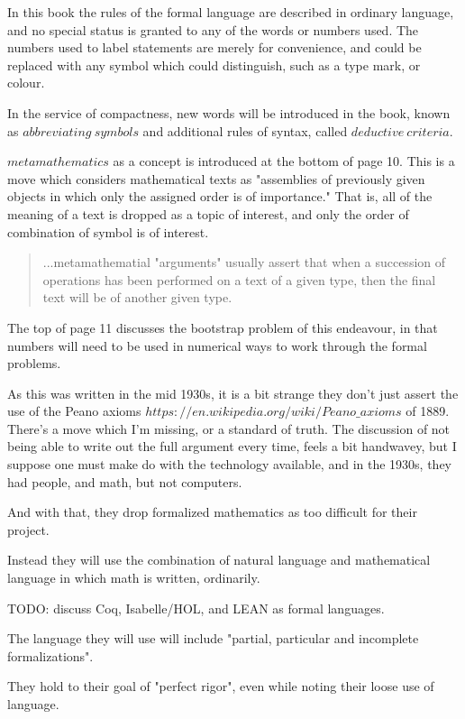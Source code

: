 \documentclass[]{scrartcl}
\begin{document}
In this book the rules of the formal language are described in ordinary language, and no special status is granted to any of the words or numbers used. The numbers used to label statements are merely for convenience, and could be replaced with any symbol which could distinguish, such as a type mark, or colour.

In the service of compactness, new words will be introduced in the book, known as $abbreviating\ symbols$ and additional rules of syntax, called $deductive\ criteria$. 

$metamathematics$ as a concept is introduced at the bottom of page 10. This is a move which considers mathematical texts as "assemblies of previously given objects in which only the assigned order is of importance." That is, all of the meaning of a text is dropped as a topic of interest, and only the order of combination of symbol is of interest. 

\begin{quote}
	...metamathematial "arguments" usually assert that when a succession of operations has been performed on a text of a given type, then the final text will be of another given type.
\end{quote}

The top of page 11 discusses the bootstrap problem of this endeavour, in that numbers will need to be used in numerical ways to work through the formal problems. 

As this was written in the mid 1930s, it is a bit strange they don't just assert the use of the Peano axioms \(https://en.wikipedia.org/wiki/Peano \_ axioms\) of 1889. There's a move which I'm missing, or a standard of truth. The discussion of not being able to write out the full argument every time, feels a bit handwavey, but I suppose one must make do with the technology available, and in the 1930s, they had people, and math, but not computers.

And with that, they drop formalized mathematics as too difficult for their project.

Instead they will use the combination of natural language and mathematical language in which math is written, ordinarily.

TODO: discuss Coq, Isabelle/HOL, and LEAN as formal languages.

The language they will use will include "partial, particular and incomplete formalizations".

They hold to their goal of "perfect rigor", even while noting their loose use of language.
\end{document}
